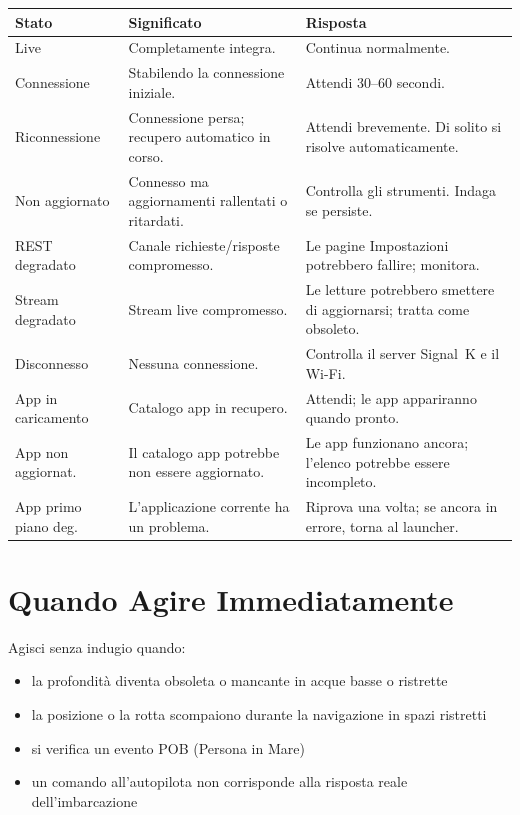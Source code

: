 \begin{longtable}{L{3.2cm}L{4.8cm}L{5.7cm}}
\toprule
{}
\color{white}\sffamily\bfseries Stato &
\color{white}\sffamily\bfseries Significato &
\color{white}\sffamily\bfseries Risposta \\
\midrule
Live               & Completamente integra. &
  Continua normalmente. \\
Connessione        & Stabilendo la connessione iniziale. &
  Attendi 30--60 secondi. \\
Riconnessione      & Connessione persa; recupero automatico in corso. &
  Attendi brevemente. Di solito si risolve automaticamente. \\
Non aggiornato     & Connesso ma aggiornamenti rallentati o ritardati. &
  Controlla gli strumenti. Indaga se persiste. \\
REST degradato     & Canale richieste/risposte compromesso. &
  Le pagine Impostazioni potrebbero fallire; monitora. \\
Stream degradato   & Stream live compromesso. &
  Le letture potrebbero smettere di aggiornarsi; tratta come obsoleto. \\
Disconnesso        & Nessuna connessione. &
  Controlla il server Signal~K e il Wi-Fi. \\
App in caricamento & Catalogo app in recupero. &
  Attendi; le app appariranno quando pronto. \\
App non aggiornat. & Il catalogo app potrebbe non essere aggiornato. &
  Le app funzionano ancora; l'elenco potrebbe essere incompleto. \\
App primo piano deg.& L'applicazione corrente ha un problema. &
  Riprova una volta; se ancora in errore, torna al launcher. \\
\bottomrule
\end{longtable}

\section{Quando Agire Immediatamente}

Agisci senza indugio quando:

\begin{itemize}
  \item la profondità diventa obsoleta o mancante in acque basse o ristrette
  \item la posizione o la rotta scompaiono durante la navigazione in spazi ristretti
  \item si verifica un evento POB (Persona in Mare)
  \item un comando all'autopilota non corrisponde alla risposta reale dell'imbarcazione
\end{itemize}

